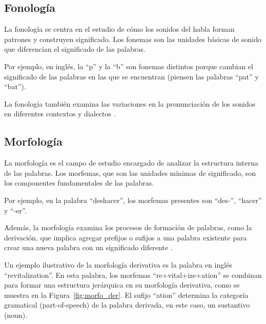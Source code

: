 \subsection{Fonología}

La fonología se centra en el estudio de cómo los sonidos del habla forman patrones y construyen significado. Los fonemas son las unidades básicas de sonido que diferencian el significado de las palabras.
\begin{example}
Por ejemplo, en inglés, la ``p'' y la ``b'' son fonemas distintos porque cambian el significado de las palabras en las que se encuentran (piensen las palabras ``pat'' y ``bat''). 
\end{example}

La fonología también examina las variaciones en la pronunciación de los sonidos en diferentes contextos y dialectos \cite{fromkin2018introduction}.
\subsection{Morfología}

La morfología es el campo de estudio encargado de analizar la estructura interna de las palabras. Los morfemas, que son las unidades mínimas de significado, son los componentes fundamentales de las palabras. 
\begin{example}
Por ejemplo, en la palabra ``deshacer'', los morfemas presentes son ``des-'', ``hacer'' y ``-er''.  
\end{example}

Además, la morfología examina los procesos de formación de palabras, como la derivación, que implica agregar prefijos o sufijos a una palabra existente para crear una nueva palabra con un significado diferente \cite{JohnsonMLSS}.

\begin{example}
Un ejemplo ilustrativo de la morfología derivativa es la palabra en inglés ``revitalization''. En esta palabra, los morfemas ``re+vital+ize+ation'' se combinan para formar una estructura jerárquica en su morfología derivativa, como se muestra en la Figura~\ref{fig:morfo_der}. El sufijo ``ation'' determina la categoría gramatical (part-of-speech) de la palabra derivada, en este caso, un sustantivo (noun). 
\end{example}



